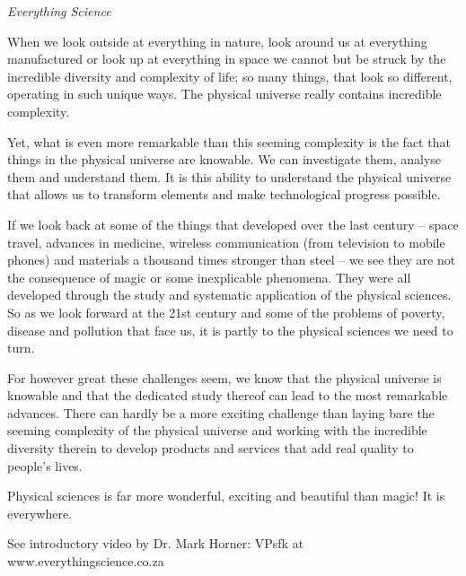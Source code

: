 \newpage
\thispagestyle{empty}

{\normalfont\sffamily\fontsize{22}\normalfont\itshape Everything Science} \par

{ \Large
When we look outside at everything in nature, look around us at everything manufactured or look up at everything in space we cannot but be struck by the incredible diversity and complexity of life; so many things, that look so different, operating in such unique ways. The physical universe really contains incredible complexity.\par

Yet, what is even more remarkable than this seeming complexity is the fact that things in the physical universe are knowable. We can investigate them, analyse them and understand them. It is this ability to understand the physical universe that allows us to transform elements and make technological progress possible.\par

If we look back at some of the things that developed over the last century – space travel, advances in medicine, wireless communication (from television to mobile phones) and materials a thousand times stronger than steel – we see they are not the consequence of magic or some inexplicable phenomena. They were all developed through the study and systematic application of the physical sciences. So as we look forward at the 21st century and some of the problems of poverty, disease and pollution that face us, it is partly to the physical sciences we need to turn. \par

For however great these challenges seem, we know that the physical universe is knowable and that the dedicated study thereof can lead to the most remarkable advances. There can hardly be a more exciting challenge than laying bare the seeming complexity of the physical universe and working with the incredible diversity therein to develop products and services that add real quality to people’s lives.\par

Physical sciences is far more wonderful, exciting and beautiful than magic! It is everywhere.

See introductory video by Dr. Mark Horner:  VPsfk at www.everythingscience.co.za

}





